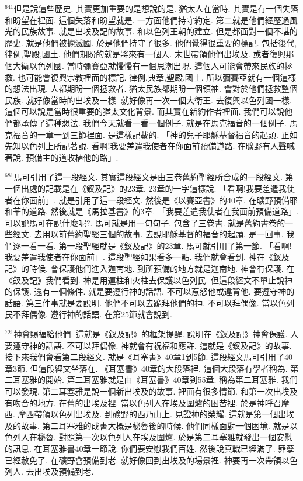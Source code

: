 \documentclass{book}
\begin{document}
$^{641}$但是說這些歷史.
其實更加重要的是想說的是.
猶太人在當時.
其實是有一個失落和盼望在裡面.
這個失落和盼望就是.
一方面他們持守約定.
第二就是他們經歷過風光的民族故事.
就是出埃及記的故事.
和以色列王朝的建立.
但是都面對一個不堪的歷史.
就是他們被擄滅國.
於是他們持守了很多.
他們覺得很重要的標記.
包括後代,律例,聖殿,國土.
他們期盼的就是將來有一個人.
末世帶領他們出埃及.
或者復興那個大衛以色列國.
當時彌賽亞就慢慢有一個思潮出現.
這個人可能會帶來民族的拯救.
也可能會復興宗教裡面的標記.
律例,典章,聖殿,國土.
所以彌賽亞就有一個這樣的想法出現.
人都期盼一個拯救者.
猶太民族都期盼一個領袖.
會對於他們拯救整個民族.
就好像當時的出埃及一樣.
就好像再一次一個大衛王.
去復興以色列國一樣.
這個可以說是當時很重要的猶太文化背景.
而其實在新約作者裡面.
我們可以說他們都承傳了這種想法.
我們今天就看一看一個例子.
就是在馬克福音的一個例子.
馬克福音的一章一到三節裡面.
是這樣記載的.
「神的兒子耶穌基督福音的起頭.
正如先知以色列上所記著說.
看啊!我要差遣我使者在你面前預備道路.
在曠野有人聲喊著說.
預備主的道收植他的路」.

$^{681}$馬可引用了這一段經文.
其實這段經文是由三卷舊約聖經所合成的一段經文.
第一個出處的記載是在《釵及記》的23章.
23章的一字這樣說.
「看啊!我要差遣我使者在你面前」.
就是引用了這一段經文.
然後是《以賽亞書》的40章.
在曠野預備耶和華的道路.
然後就是《馬拉基書》的3章.
「我要差遣我使者在我面前預備道路」.
可以說馬可在說什麼呢?.
馬可就是用一句句子.
包含了三卷書.
就是舊約書卷的一些經文.
去用以前舊約聖經三個的故事.
去說耶穌基督的福音的起頭.
是一回事.
我們逐一看一看.
第一段聖經就是《釵及記》的23章.
馬可就引用了第一節.
「看啊!我要差遣我使者在你面前」.
這段聖經如果看多一點.
我們就會看到.
神在《釵及記》的時候.
會保護他們進入迦南地.
到所預備的地方就是迦南地.
神會有保護.
在《釵及記》我們看到.
神是用運柱和火柱去保護以色列民.
但這段經文不單止說神的保護.
還有一個條件.
就是要遵行神的話語.
不可以惹怒他或違背他.
要遵守神的話語.
第三件事就是要說明.
他們不可以去跪拜他們的神.
不可以拜偶像.
當以色列民不拜偶像.
遵行神的話語.
在第25節就會說到.

$^{721}$神會賜福給他們.
這就是《釵及記》的框架提醒.
說明在《釵及記》神會保護.
人要遵守神的話語.
不可以拜偶像.
神就會有祝福和應許.
這就是《釵及記》的故事.
接下來我們會看第二段經文.
就是《耳塞書》40章1到5節.
這段經文馬可引用了40章3節.
但這段經文坐落在.
《耳塞書》40章的大段落裡.
這個大段落有學者稱為.
第二耳塞雅的開始.
第二耳塞雅就是由《耳塞書》40章到55章.
稱為第二耳塞雅.
我們可以發現.
第二耳塞雅是說一個新出埃及的故事.
裡面有很多情節.
和第一次出埃及有吻合的地方.
在舊的出埃及裡.
當以色列人在埃及圍爐的困苦裡.
於是神呼召摩西.
摩西帶領以色列出埃及.
到礦野的西乃山上.
見證神的榮耀.
這就是第一個出埃及的故事.
第二耳塞雅的成書大概是秘魯後的時候.
他們同樣面對一個困境.
就是以色列人在秘魯.
對照第一次以色列人在埃及圍爐.
於是第二耳塞雅就發出一個安慰的訊息.
在耳塞雅書40章一節說.
你們要安慰我們百姓.
然後說真戰已經滿了.
罪孽已經赦免了.
在礦野會預備到老.
就好像回到出埃及的場景裡.
神要再一次帶領以色列人.
去出埃及預備到老.
\end{document}
